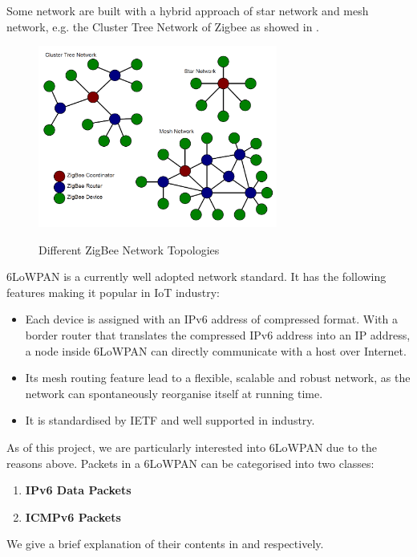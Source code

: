 Some network are built with a hybrid approach of star network and mesh network, e.g. the Cluster Tree Network of Zigbee\cite{Zigbee} as showed in .

\begin{figure}[h!]
	\centering
	{
		\includegraphics[width=0.7\textwidth,]{fig/ZigBeeTopologies.png}
	}
	\caption{Different ZigBee Network Topologies} \label{fig: ZigBee Topologies}
\end{figure}

6LoWPAN is a currently well adopted network standard. It has the following features making it popular in IoT industry: 
\begin{itemize}
	\item Each device is assigned with an IPv6 address of compressed format. With a border router that translates the compressed IPv6 address into an IP address, a node inside 6LoWPAN  can directly communicate with a host over Internet.
	\item Its mesh routing feature lead to a flexible, scalable and robust network, as the network can spontaneously reorganise itself at running time.
	\item It is standardised by IETF and well supported in industry.
\end{itemize}

As of this project, we are particularly interested into 6LoWPAN due to the reasons above. Packets in a 6LoWPAN can be categorised into two classes:
\begin{enumerate}
	\item \textbf{IPv6 Data Packets}
	\item \textbf{ICMPv6 Packets}
\end{enumerate}
We give a brief explanation of their contents in  and  respectively.

